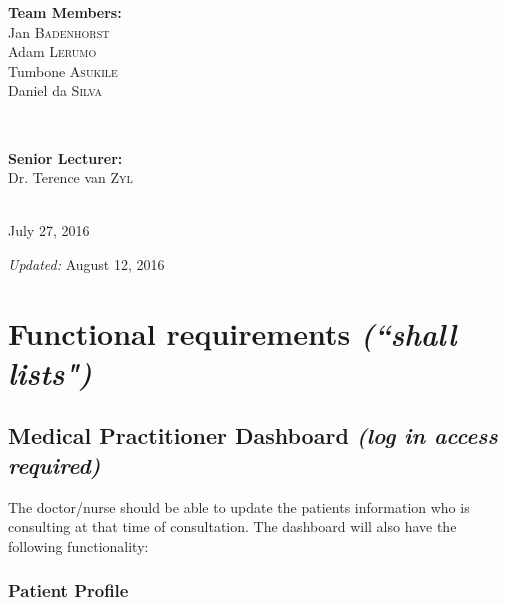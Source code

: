 \documentclass[a4paper]{article}
\begin{document}
\begin{titlepage}
\begin{minipage}{0.4\textwidth}
\begin{flushleft} \large

\textbf{Team Members:} \\[0.3cm]

Jan \textsc{Badenhorst} \\
Adam \textsc{Lerumo} \\
Tumbone \textsc{Asukile} \\
Daniel da \textsc{Silva} \\

\end{flushleft}

\end{minipage} \\[0.7cm]

\begin{minipage}{0.4\textwidth}

\begin{flushright} \large

\textbf{Senior Lecturer:} \\[0.3cm]

Dr. Terence van \textsc{Zyl} \\

\end{flushright}

\end{minipage} \\[2cm]

{\large July 27, 2016}

{\emph{Updated:} August 12, 2016}
    
\end{titlepage}

\setlength\parindent{24pt}

\section{Functional requirements \emph{(``shall lists")}}

\subsection{Medical Practitioner Dashboard \emph{(log in access required)}}

The doctor/nurse should be able to update the patients information who is consulting at that time of consultation. The dashboard will also have the following functionality:

\subsubsection{Patient Profile}
\end{document}
